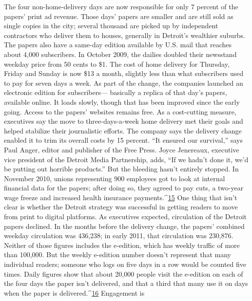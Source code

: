 The four non-home-delivery days are now responsible for only 7 percent of
the papers' print ad revenue. Those days' papers are smaller and are still sold as
single copies in the city; several thousand are picked up by independent contractors
who deliver them to houses, generally in Detroit's wealthier suburbs. The
papers also have a same-day edition available by U.S. mail that reaches about
4,000 subscribers.
In October 2009, the dailies doubled their newsstand weekday price from 50
cents to \$1. The cost of home delivery for Thursday, Friday and Sunday is now
\$13 a month, slightly less than what subscribers used to pay for seven days a week.
As part of the change, the companies launched an electronic edition for subscribers—
basically a replica of that day's papers, available online. It loads slowly,
though that has been improved since the early going. Access to the papers' websites
remains free.
As a cost-cutting measure, executives say the move to three-days-a-week home
delivery met their goals and helped stabilize their journalistic efforts. The company
says the delivery change enabled it to trim its overall costs by 15 percent.
``It ensured our survival,'' says Paul Anger, editor and publisher of the Free Press.
Joyce Jenereaux, executive vice president of the Detroit Media Partnership, adds,
``If we hadn't done it, we'd be putting out horrible products.'' But the bleeding
hasn't entirely stopped. In November 2010, unions representing 900 employees
got to look at internal financial data for the papers; after doing so, they agreed
to pay cuts, a two-year wage freeze and increased health insurance payments.^{\href{#endnotes-chapter-7}{15}}
One thing that isn't clear is whether the Detroit strategy was successful in
getting readers to move from print to digital platforms. As executives expected,
circulation of the Detroit papers declined. In the months before the delivery
change, the papers' combined weekday circulation was 436,238; in early 2011,
that circulation was 230,876. Neither of those figures includes the e-edition,
which has weekly traffic of more than 100,000. But the weekly e-edition number
doesn't represent that many individual readers; someone who logs on five
days in a row would be counted five times. Daily figures show that about 20,000
people visit the e-edition on each of the four days the paper isn't delivered, and
that a third that many use it on days when the paper is delivered.^{\href{#endnotes-chapter-7}{16}} Engagement is
